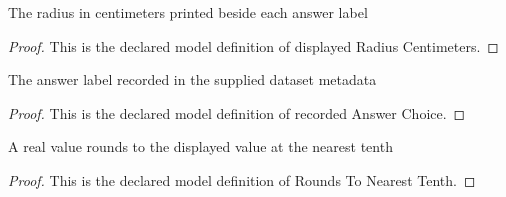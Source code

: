 \begin{definition}
  \label{def:physics:phyx-mini-0315:phyxminiproblems-problemphyxmini0315-displayedradiuscentimeters}
  The radius in centimeters printed beside each answer label
\end{definition}
\begin{proof}
  This is the declared model definition of displayed Radius Centimeters.
\end{proof}
\begin{definition}
  \label{def:physics:phyx-mini-0315:phyxminiproblems-problemphyxmini0315-recordedanswerchoice}
  The answer label recorded in the supplied dataset metadata
\end{definition}
\begin{proof}
  This is the declared model definition of recorded Answer Choice.
\end{proof}
\begin{definition}
  \label{def:physics:phyx-mini-0315:phyxminiproblems-problemphyxmini0315-roundstonearesttenth}
  A real value rounds to the displayed value at the nearest tenth
\end{definition}
\begin{proof}
  This is the declared model definition of Rounds To Nearest Tenth.
\end{proof}
